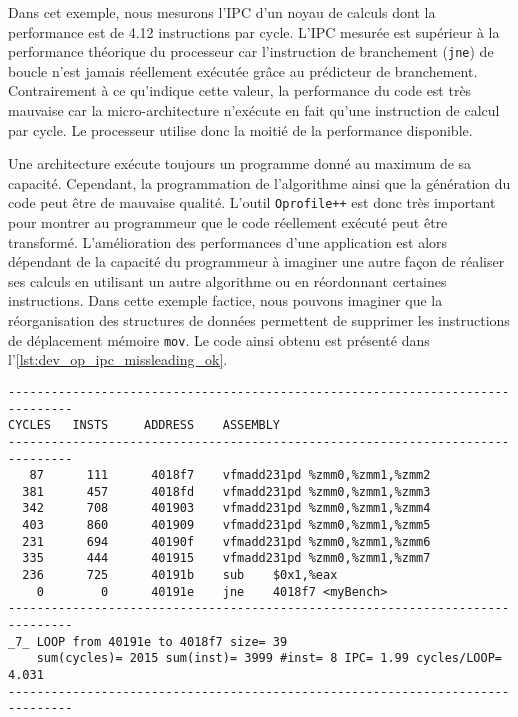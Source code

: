         
        Dans cet exemple, nous mesurons l'IPC d'un noyau de calculs dont la performance est de 4.12 instructions par cycle. L'IPC mesurée est supérieur à la performance théorique du processeur car l'instruction de branchement (\verb=jne=) de boucle n'est jamais réellement exécutée grâce au prédicteur de branchement. Contrairement à ce qu'indique cette valeur, la performance du code est très mauvaise car la micro-architecture n'exécute en fait qu'une instruction de calcul par cycle. Le processeur utilise donc la moitié de la performance disponible.
    
        Une architecture exécute toujours un programme donné au maximum de sa capacité. Cependant, la programmation de l'algorithme ainsi que la génération du code peut être de mauvaise qualité. L'outil \verb=Oprofile++= est donc très important pour montrer au programmeur que le code réellement exécuté peut être transformé. L'amélioration des performances d'une application est alors dépendant de la capacité du programmeur à imaginer une autre façon de réaliser ses calculs en utilisant un autre algorithme ou en réordonnant certaines instructions. Dans cette exemple factice, nous pouvons imaginer que la réorganisation des structures de données permettent de supprimer les instructions de déplacement mémoire \verb=mov=. Le code ainsi obtenu est présenté dans  l'\autoref{lst:dev_op_ipc_missleading_ok}. 
    
\begin{lstlisting}[label=lst:dev_op_ipc_missleading_ok, caption=Noyau de calcul exécutant deux opérations de calcul par cycle.]
-------------------------------------------------------------------------------
CYCLES   INSTS     ADDRESS    ASSEMBLY                         
-------------------------------------------------------------------------------
   87      111      4018f7    vfmadd231pd %zmm0,%zmm1,%zmm2
  381      457      4018fd    vfmadd231pd %zmm0,%zmm1,%zmm3
  342      708      401903    vfmadd231pd %zmm0,%zmm1,%zmm4
  403      860      401909    vfmadd231pd %zmm0,%zmm1,%zmm5
  231      694      40190f    vfmadd231pd %zmm0,%zmm1,%zmm6
  335      444      401915    vfmadd231pd %zmm0,%zmm1,%zmm7
  236      725      40191b    sub    $0x1,%eax
    0        0      40191e    jne    4018f7 <myBench>
-------------------------------------------------------------------------------
_7_ LOOP from 40191e to 4018f7 size= 39
    sum(cycles)= 2015 sum(inst)= 3999 #inst= 8 IPC= 1.99 cycles/LOOP= 4.031
-------------------------------------------------------------------------------
\end{lstlisting}

